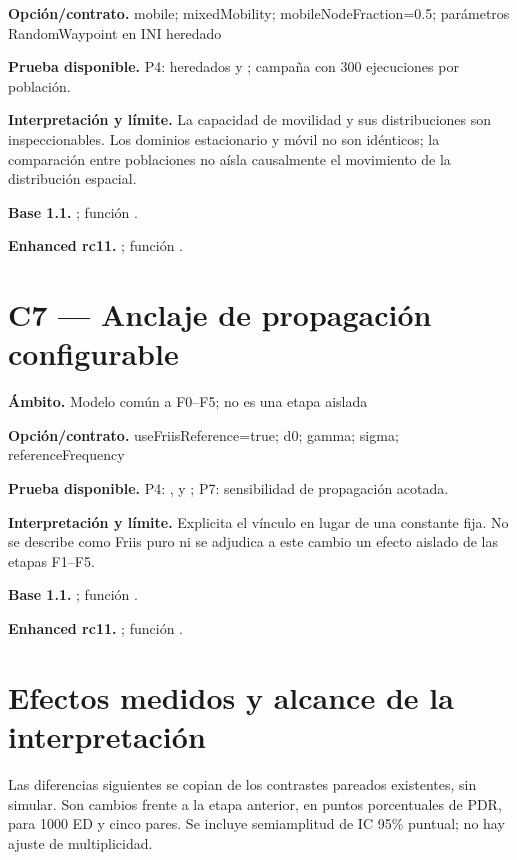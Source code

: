 \documentclass[10pt,a4paper]{article}
\begin{document}
\textbf{Opción/contrato.} mobile; mixedMobility; mobileNodeFraction=0.5; parámetros RandomWaypoint en INI heredado

\textbf{Prueba disponible.} P4:  heredados y ; campaña con 300 ejecuciones por población.

\textbf{Interpretación y límite.} La capacidad de movilidad y sus distribuciones son inspeccionables. Los dominios estacionario y móvil no son idénticos; la comparación entre poblaciones no aísla causalmente el movimiento de la distribución espacial.

\textbf{Base 1.1.} ; función .\par
\textbf{Enhanced rc11.} ; función .\par
\section*{C7 — Anclaje de propagación configurable}
\textbf{Ámbito.} Modelo común a F0–F5; no es una etapa aislada

\textbf{Opción/contrato.} useFriisReference=true; d0; gamma; sigma; referenceFrequency

\textbf{Prueba disponible.} P4: ,  y ; P7: sensibilidad de propagación acotada.

\textbf{Interpretación y límite.} Explicita el vínculo  en lugar de una constante fija. No se describe como Friis puro ni se adjudica a este cambio un efecto aislado de las etapas F1–F5.

\textbf{Base 1.1.} ; función .\par
\textbf{Enhanced rc11.} ; función .\par
\section*{Efectos medidos y alcance de la interpretación}
Las diferencias siguientes se copian de los contrastes pareados existentes, sin simular. Son cambios frente a la etapa anterior, en puntos porcentuales de PDR, para 1000 ED y cinco pares. Se incluye semiamplitud de IC 95\% puntual; no hay ajuste de multiplicidad.
\end{document}
